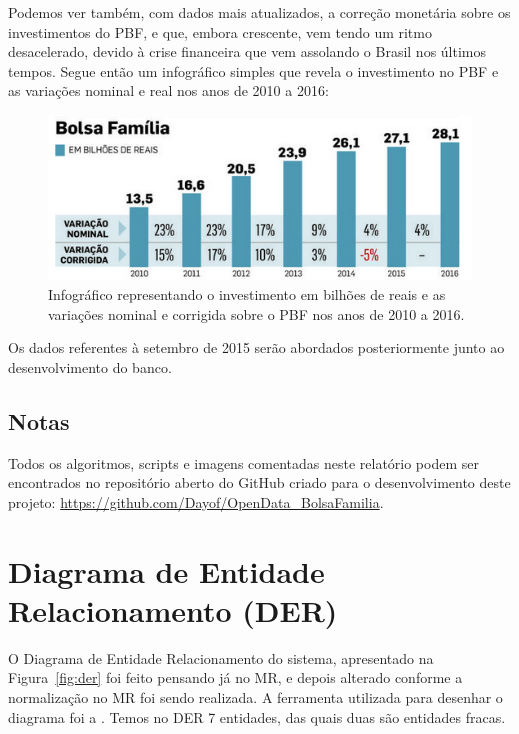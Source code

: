 \documentclass[12pt]{article}
\begin{document}
	Podemos ver também, com dados mais atualizados, a correção monetária sobre os investimentos do PBF, e que, embora crescente, vem tendo um ritmo desacelerado, devido à crise financeira que vem assolando o Brasil nos últimos tempos. Segue então um infográfico simples que revela o investimento no PBF e as variações nominal e real nos anos de 2010 a 2016:
	
	\begin{figure}[H]
		\centering
		\includegraphics[width=1\textwidth]{inf_10_16.png}
		\caption{Infográfico representando o investimento em bilhões de reais e as variações nominal e corrigida sobre o PBF nos anos de 2010 a 2016.}
		\label{fig:inf_10_16}
	\end{figure}
	
	Os dados referentes à setembro de 2015 serão abordados posteriormente junto ao desenvolvimento do banco.
	
	\subsection{Notas}
	\label{sec:notes}
	
	Todos os algoritmos, scripts e imagens comentadas neste relatório podem ser encontrados no repositório aberto do GitHub criado para o desenvolvimento deste projeto: \url{https://github.com/Dayof/OpenData_BolsaFamilia}. 
	
	\section{Diagrama de Entidade Relacionamento (DER)}
	\label{sec:der}
	
	O Diagrama de Entidade Relacionamento do sistema, apresentado na Figura~\ref{fig:der} foi feito pensando já no MR, e depois alterado conforme a normalização no MR foi sendo realizada. A ferramenta utilizada para desenhar o diagrama foi a \cite{lucid}. Temos no DER 7 entidades, das quais duas são entidades fracas. 
	
\end{document}
